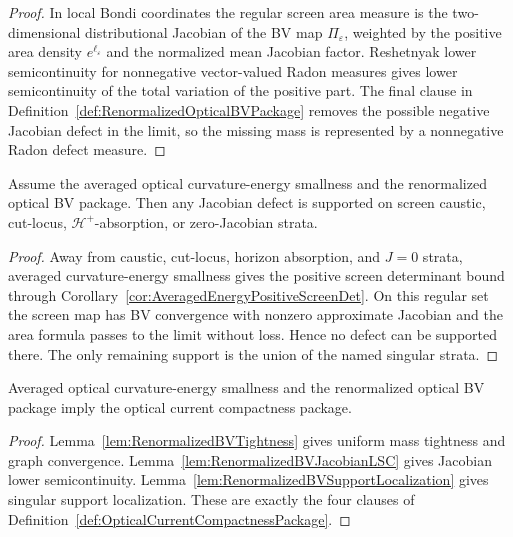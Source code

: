 \begin{proof}
In local Bondi coordinates the regular screen area measure is the two-dimensional distributional Jacobian of the BV map $\Pi_\varepsilon$, weighted by the positive area density $e^{\ell_\varepsilon}$ and the normalized mean Jacobian factor. Reshetnyak lower semicontinuity for nonnegative vector-valued Radon measures gives lower semicontinuity of the total variation of the positive part. The final clause in Definition~\ref{def:RenormalizedOpticalBVPackage} removes the possible negative Jacobian defect in the limit, so the missing mass is represented by a nonnegative Radon defect measure.
\end{proof}

\begin{lemma}\label{lem:RenormalizedBVSupportLocalization}
Assume the averaged optical curvature-energy smallness and the renormalized optical BV package. Then any Jacobian defect is supported on screen caustic, cut-locus, $\mathcal H^+$-absorption, or zero-Jacobian strata.
\end{lemma}

\begin{proof}
Away from caustic, cut-locus, horizon absorption, and $J=0$ strata, averaged curvature-energy smallness gives the positive screen determinant bound through Corollary~\ref{cor:AveragedEnergyPositiveScreenDet}. On this regular set the screen map has BV convergence with nonzero approximate Jacobian and the area formula passes to the limit without loss. Hence no defect can be supported there. The only remaining support is the union of the named singular strata.
\end{proof}

\begin{theorem}\label{thm:RenormalizedBVOpticalCurrentCompactness}
Averaged optical curvature-energy smallness and the renormalized optical BV package imply the optical current compactness package.
\end{theorem}

\begin{proof}
Lemma~\ref{lem:RenormalizedBVTightness} gives uniform mass tightness and graph convergence. Lemma~\ref{lem:RenormalizedBVJacobianLSC} gives Jacobian lower semicontinuity. Lemma~\ref{lem:RenormalizedBVSupportLocalization} gives singular support localization. These are exactly the four clauses of Definition~\ref{def:OpticalCurrentCompactnessPackage}.
\end{proof}

